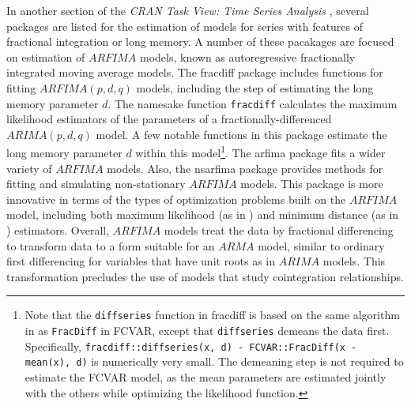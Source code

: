 \documentclass[11pt,letterpaper]{paper}
\newcommand{\pkg}[1]{{\normalfont\fontseries{b}\selectfont #1}}
\let\code=\texttt
\let\fct=\texttt
\begin{document}
In another section of the \emph{CRAN Task View: Time Series Analysis} \citep{Hyndman2020}, 
several packages are listed for the estimation of models for series with features of fractional integration or long memory. 
A number of these pacakages are focused on estimation of $ARFIMA$ models, known as autoregressive fractionally integrated moving average models. 
The \pkg{fracdiff} package \citep{fracdiff2020} includes functions for fitting $ARFIMA(p,d,q)$ models, including the step of estimating the long memory parameter $d$. 
The namesake function \fct{fracdiff} calculates the maximum likelihood estimators of the parameters of a fractionally-differenced $ARIMA(p,d,q)$ model. 
A few notable functions in this package estimate the long memory parameter $d$ within this model\footnote{Note that the \fct{diffseries} function in \pkg{fracdiff} is based on the same algorithm in \cite{Jensen2014} as \fct{FracDiff} in \pkg{FCVAR}, except that \fct{diffseries} demeans the data first. Specifically, \code{fracdiff::diffseries(x, d) - FCVAR::FracDiff(x - mean(x), d)} is numerically very small. 
The demeaning step is not required to estimate the FCVAR model, as the mean parameters are estimated jointly with the others while optimizing the likelihood function. }. 
% 
The \pkg{arfima} package \cite{arfima2018} fits a wider variety of $ARFIMA$ models. 
% 
Also, the \pkg{nsarfima} \citep{nsarfima2019} package provides methods for fitting and simulating non-stationary $ARFIMA$ models. 
This package is more innovative in terms of the types of optimization problems built on the $ARFIMA$ model, including both maximum likelihood (as in \citet{Beran1995}) and minimum distance (as in \citet{Mayoral2007}) estimators. 
Overall, $ARFIMA$ models treat the data by fractional differencing to transform data to a form suitable for an $ARMA$ model, 
similar to ordinary first differencing for variables that have unit roots as in $ARIMA$ models. 
This transformation precludes the use of models that study cointegration relationships. 
\end{document}
